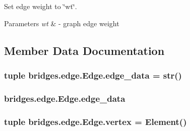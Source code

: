 Set edge weight to \char`\"{}wt\char`\"{}. 


\begin{DoxyParams}{Parameters}
{\em wt} & -\/ graph edge weight \\
\hline
\end{DoxyParams}


\subsection{Member Data Documentation}
\hypertarget{classbridges_1_1edge_1_1_edge_a1bdbba563466042b45089320f6232a40}{}
\subsubsection[{edge\+\_\+data}]{\setlength{\rightskip}{0pt plus 5cm}tuple bridges.\+edge.\+Edge.\+edge\+\_\+data = str()\hspace{0.3cm}{\ttfamily [static]}}\label{classbridges_1_1edge_1_1_edge_a1bdbba563466042b45089320f6232a40}
\hypertarget{classbridges_1_1edge_1_1_edge_af9697b2b1e1e87d880a10c0c4e7de70d}{}
\subsubsection[{edge\+\_\+data}]{\setlength{\rightskip}{0pt plus 5cm}bridges.\+edge.\+Edge.\+edge\+\_\+data}\label{classbridges_1_1edge_1_1_edge_af9697b2b1e1e87d880a10c0c4e7de70d}
\hypertarget{classbridges_1_1edge_1_1_edge_a74edcc1b64f904141578fae68593be03}{}
\subsubsection[{vertex}]{\setlength{\rightskip}{0pt plus 5cm}tuple bridges.\+edge.\+Edge.\+vertex = {\bf Element}()\hspace{0.3cm}{\ttfamily [static]}}\label{classbridges_1_1edge_1_1_edge_a74edcc1b64f904141578fae68593be03}
\hypertarget{classbridges_1_1edge_1_1_edge_af894a206ef35d03cdb75faea83a0fc5a}{}
